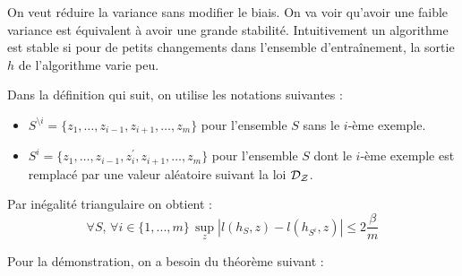 

On veut réduire la variance sans modifier le biais. On va voir qu'avoir une faible variance est équivalent à avoir une grande stabilité. Intuitivement un algorithme est stable si pour de petits changements dans l'ensemble d'entraînement, la sortie $h$ de l'algorithme varie peu.

Dans la définition qui suit, on utilise les notations suivantes :
\begin{itemize}
	\item $S^{\setminus i} = \{ z_1, \dots, z_{i-1}, z_{i+1}, \dots, z_m \}$ pour l'ensemble $S$ sans le $i$-ème exemple.
	\item $S^{i} = \{ z_1, \dots, z_{i-1}, z_i^\prime, z_{i+1}, \dots, z_m \}$ pour l'ensemble $S$ dont le $i$-ème exemple est remplacé par une valeur aléatoire suivant la loi $\mathcal{D_Z}$.
\end{itemize}


Par inégalité triangulaire on obtient :
$$ \forall S, \, \forall i \in \{1, ..., m\} \, \sup_z \left| l(h_S, z) - l(h_{S^{i}}, z) \right| \leqslant 2 \dfrac{\beta}{m} $$



Pour la démonstration, on a besoin du théorème suivant :

